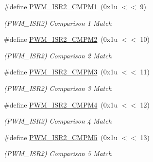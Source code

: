 \begin{DoxyCompactItemize}
\mbox{\label{group__SAMV71__PWM_gaf3e6a85fe528741a0a1c32a8a8bb3755}} 
\#define \mbox{\hyperlink{group__SAMV71__PWM_gaf3e6a85fe528741a0a1c32a8a8bb3755}{P\+W\+M\+\_\+\+I\+S\+R2\+\_\+\+C\+M\+P\+M1}}~(0x1u $<$$<$ 9)
\begin{DoxyCompactList}\small\item\em (P\+W\+M\+\_\+\+I\+S\+R2) Comparison 1 Match \end{DoxyCompactList}\item 
\mbox{\label{group__SAMV71__PWM_ga26aa7d6e543c00c9b4c5e5ba6c89a20e}} 
\#define \mbox{\hyperlink{group__SAMV71__PWM_ga26aa7d6e543c00c9b4c5e5ba6c89a20e}{P\+W\+M\+\_\+\+I\+S\+R2\+\_\+\+C\+M\+P\+M2}}~(0x1u $<$$<$ 10)
\begin{DoxyCompactList}\small\item\em (P\+W\+M\+\_\+\+I\+S\+R2) Comparison 2 Match \end{DoxyCompactList}\item 
\mbox{\label{group__SAMV71__PWM_gae70463799be2768ca584ccdb80f89257}} 
\#define \mbox{\hyperlink{group__SAMV71__PWM_gae70463799be2768ca584ccdb80f89257}{P\+W\+M\+\_\+\+I\+S\+R2\+\_\+\+C\+M\+P\+M3}}~(0x1u $<$$<$ 11)
\begin{DoxyCompactList}\small\item\em (P\+W\+M\+\_\+\+I\+S\+R2) Comparison 3 Match \end{DoxyCompactList}\item 
\mbox{\label{group__SAMV71__PWM_ga3c9fd7834754a7d163c36dfecb729558}} 
\#define \mbox{\hyperlink{group__SAMV71__PWM_ga3c9fd7834754a7d163c36dfecb729558}{P\+W\+M\+\_\+\+I\+S\+R2\+\_\+\+C\+M\+P\+M4}}~(0x1u $<$$<$ 12)
\begin{DoxyCompactList}\small\item\em (P\+W\+M\+\_\+\+I\+S\+R2) Comparison 4 Match \end{DoxyCompactList}\item 
\mbox{\label{group__SAMV71__PWM_gac8cc637e69f50bd5682836481a62e263}} 
\#define \mbox{\hyperlink{group__SAMV71__PWM_gac8cc637e69f50bd5682836481a62e263}{P\+W\+M\+\_\+\+I\+S\+R2\+\_\+\+C\+M\+P\+M5}}~(0x1u $<$$<$ 13)
\begin{DoxyCompactList}\small\item\em (P\+W\+M\+\_\+\+I\+S\+R2) Comparison 5 Match \end{DoxyCompactList}\item 
$$
\end{DoxyCompactItemize}
